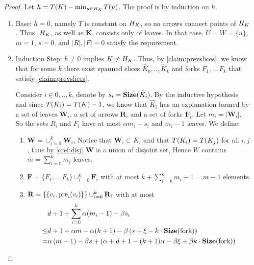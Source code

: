   \begin{proof}
    Let $h = T(K) - \min_{u \in H_{K}}T(u)$. The proof is by induction on $h$. 
    \begin{enumerate}
      \item Base: $h=0$, namely $T$ is constant on $H_{K}$, so no arrows connect points of $H_{K}$. Thus, $H_{K}$, as well as $\mathbf{K}$, consists only of leaves. In that case, $U = W = \{u\}$, $m=1$, $s=0$, and $|R|, |F| = 0$ satisfy the requirement.
      \item Induction Step: $h \neq 0$ implies $K \neq H_{K}$. Thus, by \cref{claim:prevslices}, we know that for some $k$ there exist spanned slices $\hat{K}_{0}, .., \hat{K}_{k}$ and forks $F_{1},..,F_{k}$ that satisfy \cref{claim:prevslices}. 

        Consider $i \in 0,..,k$, denote by $s_{i} = \mathbf{Size}(\hat{K}_{i})$. By the inductive hypothesis and since $T(K_{i}) = T(K) - 1$, we know that $\hat{K}_{i}$ has an explanation formed by a set of leaves $\mathbf{W}_{i}$, a set of arrows $\mathbf{R}_{i}$ and a set of forks $\mathbf{F}_{i}$. Let $m_{i} =|\mathbf{W}_{i}|$, So the sets $R_{i}$ and $F_{i}$ have at most $\alpha m_{i} - s_{i}$ and $m_{i}-1$ leaves. We define:
        \begin{enumerate}
          \item $\mathbf{W} = \cup_{i=0}^{k} \mathbf{W}_{i}$, Notice that $\mathbf{W}_{i} \subset K_{i}$ and that $T(K_{i}) = T(K_{j})$ for all $i,j$, thus by \cref{cref:disj} $\mathbf{W}$ is a union of disjoint set, Hence $W$ contains  $m = \sum_{i=0}^{k}m_{i}$ leaves. 
          \item $\mathbf{F} = \{ F_{1},..,F_{k} \} \cup_{i = 0}^{k}\mathbf{F}_{i}$ with at most $ k + \sum_{i=0}^{k}{m_{i} -1 } = m- 1$ elements. 
          \item $\mathbf{R} = \{ \{v_{i}, \text{pre}_{i}(v_{i}) \} \} \cup_{i=0}^{k}{ \mathbf{R}_{i} }$ with at most 
            \begin{equation*}
              \begin{split}
                & d+1 + \sum^{k}_{i=0}{\alpha (m_{i}-1)  - \beta s_{i} } \\ 
                \le & d+1 + \alpha m - \alpha(k+1) - \beta\left(s + \xi - k \cdot \Size{\text{fork}}  \right) \\
                = & \alpha \left(m - 1\right) - \beta s + \left(\alpha + d+1 - (k+1) \alpha - \beta \xi + \beta k \cdot \Size{\text{fork}} \right)
              \end{split}

\end{equation*}
\end{enumerate}
\end{enumerate}
\end{proof}

